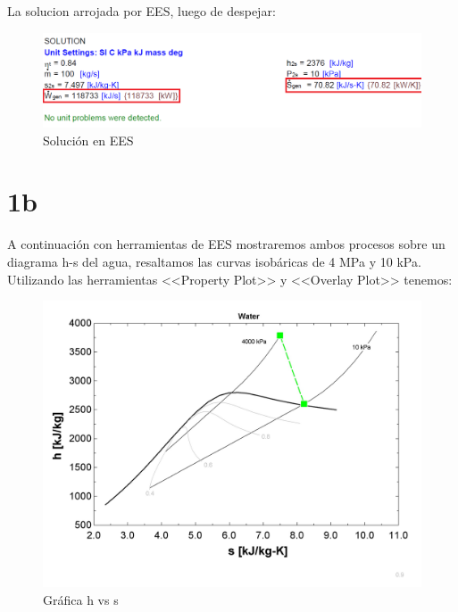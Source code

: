 \documentclass{article}
\theoremstyle{mytheoremstyle}
\theoremstyle{mytheoremstyle}
\theoremstyle{myproblemstyle}
\begin{document}
        La solucion arrojada por EES, luego de despejar:
        \begin{figure}[h!] %
            \centering
            \includegraphics[width=1.1\textwidth]{solutions1.png} %
            \caption{Solución en EES}
            \label{fig:mi_imagen}
        \end{figure}
\newpage
    \section*{1b}
    A continuación con herramientas de EES mostraremos ambos procesos sobre un diagrama h-s del agua, resaltamos las curvas isobáricas de 4 MPa y 10 kPa. Utilizando las herramientas <<Property Plot>> y <<Overlay Plot>> tenemos:
    \begin{figure}[h!] %
        \centering
        \includegraphics[width=1\textwidth]{hs.jpg} %
        \caption{Gráfica h vs s}
        \label{fig:mi_imagen}
    \end{figure}
\newpage
\end{document}
